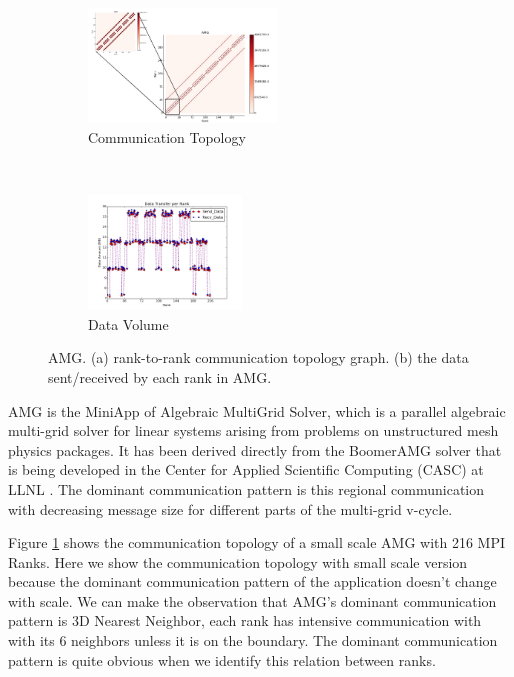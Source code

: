 \documentclass[conference]{IEEEtran}
\begin{document}
\begin{figure}[t!]
    \centering
    \begin{subfigure}[t]{0.22\textwidth}
        \centering
        \includegraphics[height=1.2in]{figs/appstudy/amg/amg_pip}
        \caption{Communication Topology}
        \label{fig: amg communication topology}
    \end{subfigure}%
    ~
    \begin{subfigure}[t]{0.22\textwidth}
        \centering
        \includegraphics[height=1.2in]{figs/appstudy/amg/amg_data_transfer}
        \caption{Data Volume}
        \label{fig: amg data trans}
    \end{subfigure}
    \caption{AMG. (a) rank-to-rank communication topology graph. (b) the data sent/received by each rank in AMG.}
\end{figure}

AMG is the MiniApp of Algebraic MultiGrid Solver, which is a parallel algebraic multi-grid solver for linear systems arising from problems on unstructured mesh physics packages. It has been derived directly from the BoomerAMG solver that is being developed in the Center for Applied Scientific Computing (CASC) at LLNL \cite{amg}. The dominant communication pattern is this regional communication with decreasing message size for different parts of the multi-grid v-cycle.

Figure \ref{fig: amg communication topology} shows the communication topology of a small scale AMG with 216 MPI Ranks. Here we show the communication topology with small scale version because the dominant communication pattern of the application doesn't change with scale. We can make the observation that AMG's dominant communication pattern is 3D Nearest Neighbor, each rank has intensive communication with with its 6 neighbors unless it is on the boundary. The dominant communication pattern is quite obvious when we identify this relation between ranks.
\end{document}
